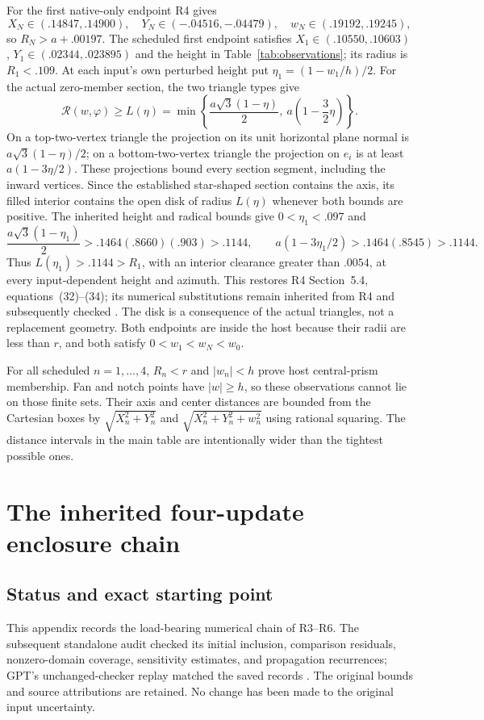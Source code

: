 \documentclass[11pt,a4paper]{article}
\numberwithin{equation}{section}
\begin{document}
For the first native-only endpoint R4 gives
\[
X_N\in(.14847,.14900),\quad Y_N\in(-.04516,-.04479),\quad
w_N\in(.19192,.19245),
\]
so $R_N>a+.00197$. The scheduled first endpoint satisfies
$X_1\in(.10550,.10603)$, $Y_1\in(.02344,.023895)$ and the height in
Table~\ref{tab:observations}; its radius is $R_1<.109$.
At each input's own perturbed height put $\eta_1=(1-w_1/h)/2$.
For the actual zero-member section, the two triangle types give
\begin{equation}\label{eq:firstinradius}
\mathcal R(w,\varphi)\geq L(\eta)
=\min\left\{\frac{a\sqrt3(1-\eta)}2,\ a\left(1-\frac32\eta\right)\right\}.
\end{equation}
On a top-two-vertex triangle the projection on its unit horizontal plane
normal is $a\sqrt3(1-\eta)/2$; on a bottom-two-vertex triangle the projection
on $e_i$ is at least $a(1-3\eta/2)$. These projections bound every section
segment, including the inward vertices. Since the established star-shaped
section contains the axis, its filled interior contains the open disk of
radius $L(\eta)$ whenever both bounds are positive.
The inherited height and radical bounds give $0<\eta_1<.097$ and
\[
\frac{a\sqrt3(1-\eta_1)}2>.1464(.8660)(.903)>.1144,\qquad
a(1-3\eta_1/2)>.1464(.8545)>.1144.
\]
Thus $L(\eta_1)>.1144>R_1$, with an interior clearance greater than $.0054$,
at every input-dependent height and azimuth. This restores R4
Section~5.4, equations~(32)--(34); its numerical substitutions remain
inherited from R4 and subsequently checked \cite{R4,Audit}.
The disk is a consequence of the actual triangles,
not a replacement geometry. Both endpoints are inside the host because their radii are
less than $r$, and both satisfy $0<w_1<w_N<w_0$.

For all scheduled $n=1,\ldots,4$, $R_n<r$ and $|w_n|<h$ prove host
central-prism membership. Fan and notch points have $|w|\geq h$, so these
observations cannot lie on those finite sets. Their axis and center
distances are bounded from the Cartesian boxes by
$\sqrt{X_n^2+Y_n^2}$ and $\sqrt{X_n^2+Y_n^2+w_n^2}$ using rational
squaring. The distance intervals in the main table are intentionally wider
than the tightest possible ones.

\section{The inherited four-update enclosure chain}\label{app:certificate}
\subsection{Status and exact starting point}
This appendix records the load-bearing numerical chain of R3--R6.
The subsequent standalone audit checked its initial inclusion, comparison
residuals, nonzero-domain coverage, sensitivity estimates, and propagation
recurrences; GPT's unchanged-checker replay matched the saved records
\cite{Audit,GPTAudit}. The original bounds and source attributions are
retained. No change has been made to the original input uncertainty.
\end{document}
